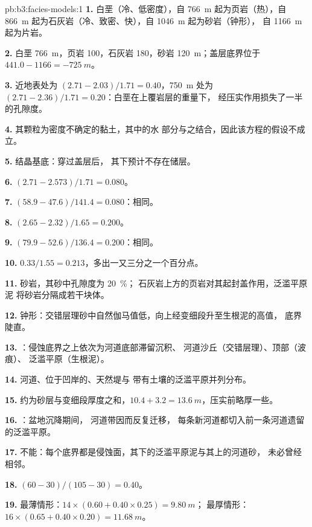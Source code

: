 \begin{solution}{pb:b3:facies-models:1}
\textbf{1.} 白垩（冷、低密度），自 \qty{766}{m} 起为页岩（热），自
\qty{866}{m} 起为石灰岩（冷、致密、快），自 \qty{1046}{m} 起为砂岩（钟形），
自 \qty{1166}{m} 起为片岩。

\textbf{2.} 白垩 \qty{766}{m}，页岩 100，石灰岩 180，砂岩
\qty{120}{m}；盖层底界位于 $441.0 - 1166 = \qty{-725}{m}$。

\textbf{3.} 近地表处为 $(2.71 - 2.03)/1.71 = 0.40$，\qty{750}{m} 处为 $(2.71 -
2.36)/1.71 = 0.20$：白垩在上覆岩层的重量下，
经压实作用损失了一半的孔隙度。

\textbf{4.} 其颗粒为密度不确定的黏土，其中的水
部分与之结合，因此该方程的假设不成立。

\textbf{5.} 结晶基底：穿过盖层后，
其下预计不存在储层。

\textbf{6.} $(2.71 - 2.573)/1.71 = 0.080$。

\textbf{7.} $(58.9 - 47.6)/141.4 = 0.080$：相同。

\textbf{8.} $(2.65 - 2.32)/1.65 = 0.200$。

\textbf{9.} $(79.9 - 52.6)/136.4 = 0.200$：相同。

\textbf{10.} $0.33/1.55 = 0.213$，多出一又三分之一个百分点。

\textbf{11.} 砂岩，其砂中孔隙度为 \qty{20}{\percent}；
石灰岩上方的页岩对其起封盖作用，泛滥平原泥
将砂岩分隔成若干块体。

\textbf{12.} 钟形：交错层理砂中自然伽马值低，向上经变细段升至生根泥的高值，
底界陡直。

\textbf{13.} ：侵蚀底界之上依次为河道底部滞留沉积、
河道沙丘（交错层理）、顶部（波痕）、
泛滥平原（生根泥）。

\textbf{14.} 河道、位于凹岸的、天然堤与
带有土壤的泛滥平原并列分布。

\textbf{15.} 约为砂层与变细段厚度之和，$10.4 + 3.2 =
\qty{13.6}{m}$，压实前略厚一些。

\textbf{16.} ：盆地沉降期间，
河道带因而反复迁移，
每条新河道都切入前一条河道遗留的泛滥平原。

\textbf{17.} 不能：每个底界都是侵蚀面，其下的泛滥平原泥与其上的河道砂，
未必曾经相邻。

\textbf{18.} $(60 - 30)/(105 - 30) = 0.40$。

\textbf{19.} 最薄情形：$14\times(0.60 + 0.40\times0.25) = \qty{9.80}{m}$；
最厚情形：$16\times(0.65 + 0.40\times0.20) = \qty{11.68}{m}$。


\end{solution}
